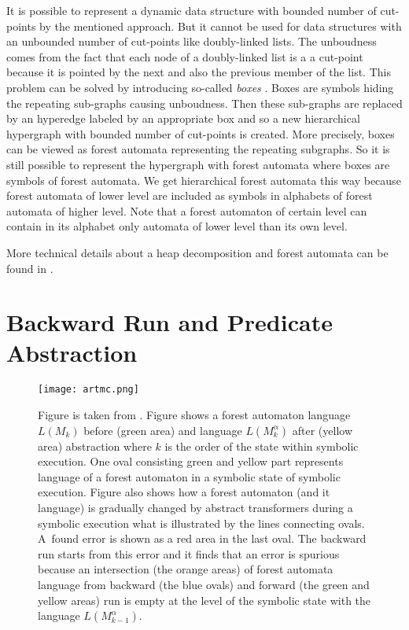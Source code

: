 \documentclass[fleqn,11pt]{ExcelAtFIT} %
\begin{document}
It is possible to represent a dynamic data structure with bounded number of cut-points by the mentioned approach.
But it cannot be used for data structures with an unbounded number of cut-points like doubly-linked lists.
The unboudness comes from the fact that each node of a doubly-linked list is a a cut-point because
it is pointed by the next and also the previous member of the list.
This problem can be solved by introducing so-called \emph{boxes} \cite{forester13}.
Boxes are symbols hiding the repeating sub-graphs causing unboudness.
Then these sub-graphs are replaced by an hyperedge labeled by an appropriate box
and so a new hierarchical hypergraph with bounded number of cut-points is created.
More precisely, boxes can be viewed as forest automata representing the repeating subgraphs.
So it is still possible to represent the hypergraph with forest automata where
boxes are symbols of forest automata.
We get hierarchical forest automata this way because forest automata of lower level
are included as symbols in alphabets of forest automata of higher level.
Note that a forest automaton of certain level can contain in its alphabet only automata of lower level than its own level.

More technical details about a heap decomposition and forest automata can be found in \cite{forester11, forester13}.

\section{Backward Run and Predicate Abstraction}
\label{sec:br}

\begin{figure}[t]
	\centering
	\texttt{[image: artmc.png]}
	\caption{
		Figure is taken from \cite{artmc}.
		Figure shows a forest automaton language $L(M_k)$ before (green area)
		and language $L(M_k^{\alpha})$ after (yellow area) abstraction where
		$k$ is the order of the state within symbolic execution.
		One oval consisting green and yellow part represents
		language of a forest automaton in a symbolic state of symbolic execution.
		Figure also shows how a forest automaton (and it language) is gradually changed
		by abstract transformers during a symbolic execution what is illustrated by the lines connecting ovals.
		A~found error is shown as a red area in the last oval.
		The backward run starts from this error and it finds
		that an error is spurious because an intersection (the orange areas) of forest automata language from backward (the blue ovals)
		and forward (the green and yellow areas) run is empty at the level of the symbolic state with the language $L(M^{\alpha}_{k-1})$.}
	\label{fig:bwrun}
\end{figure}
\end{document}
